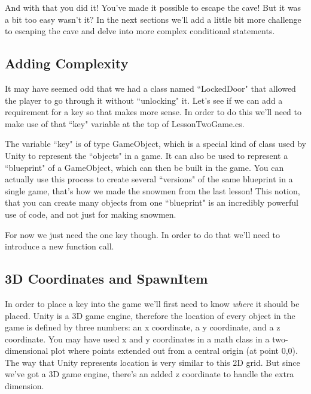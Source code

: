 \documentclass{article}
\begin{document}
\noindent{}

And with that you did it! You've made it possible to escape the cave! But it was a bit too easy wasn't it? In the next sections we'll add a little bit more challenge to escaping the cave and delve into more complex conditional statements. 

\subsection{Adding Complexity}

It may have seemed odd that we had a class named ``LockedDoor" that allowed the player to go through it without ``unlocking" it. Let's see if we can add a requirement for a key so that makes more sense. In order to do this we'll need to make use of that ``key" variable at the top of LessonTwoGame.cs. 

The variable ``key" is of type GameObject, which is a special kind of class used by Unity to represent the ``objects" in a game. It can also be used to represent a ``blueprint" of a GameObject, which can then be built in the game. You can actually use this process to create several ``versions" of the same blueprint in a single game, that's how we made the snowmen from the last lesson! This notion, that you can create many objects from one ``blueprint" is an incredibly powerful use of code, and not just for making snowmen.

For now we just need the one key though. In order to do that we'll need to introduce a new function call. 

\subsection{3D Coordinates and SpawnItem}

In order to place a key into the game we'll first need to know \textit{where} it should be placed. Unity is a 3D game engine, therefore the location of every object in the game is defined by three numbers: an x coordinate, a y coordinate, and a z coordinate. You may have used x and y coordinates in a math class in a two-dimensional plot where points extended out from a central origin (at point 0,0). The way that Unity represents location is very similar to this 2D grid. But since we've got a 3D game engine, there's an added z coordinate to handle the extra dimension.
\end{document}
